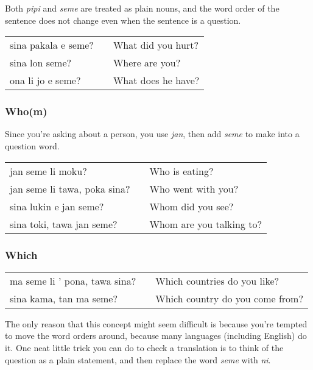 Both \textit{pipi} and \textit{seme} are treated as plain nouns, and the word order of the sentence does not change even when the sentence is a question. 

\begin{supertabular}{p{5,5cm}|ll}
sina pakala e seme? && What did you hurt? \\
sina lon seme? && Where are you? \\ 
ona li jo e seme? && What does he have? \\
\end{supertabular} 
%
\subsubsection*{Who(m)}
%
Since you're asking about a person, you use \textit{jan}, then add \textit{seme} to make into a question word. 

\begin{supertabular}{p{5,5cm}|ll}
jan seme li moku? && Who is eating? \\
jan seme li tawa, poka sina? && Who went with you? \\
sina lukin e jan seme? && Whom did you see? \\
sina toki, tawa jan seme? && Whom are you talking to? \\
\end{supertabular} 
%
\subsubsection*{Which}
%
\begin{supertabular}{p{5,5cm}|ll}
ma seme li ' pona, tawa sina? && Which countries do you like? \\
sina kama, tan ma seme? && Which country do you come from? \\ 
\end{supertabular} 

The only reason that this concept might seem difficult is because you're tempted to move the word orders around, because many languages (including English) do it. 
One neat little trick you can do to check a translation is to think of the question as a plain statement, and then replace the word \textit{seme} with \textit{ni}. 
%
{}

